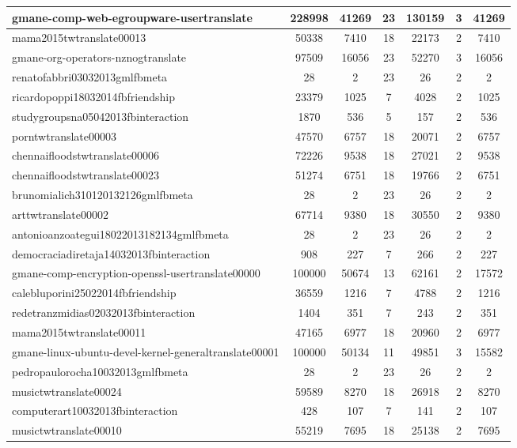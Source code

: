\begin{table*}[h!]
\begin{center}
\begin{tabular}{| l | c | c | c | c | c | c |}
gmane-comp-web-egroupware-usertranslate & 228998  & 41269  & 23  & 130159  & 3  & 41269 \\\hline
mama2015twtranslate00013 & 50338  & 7410  & 18  & 22173  & 2  & 7410 \\\hline
gmane-org-operators-nznogtranslate & 97509  & 16056  & 23  & 52270  & 3  & 16056 \\\hline
renatofabbri03032013gmlfbmeta & 28  & 2  & 23  & 26  & 2  & 2 \\\hline
ricardopoppi18032014fbfriendship & 23379  & 1025  & 7  & 4028  & 2  & 1025 \\\hline
studygroupsna05042013fbinteraction & 1870  & 536  & 5  & 157  & 2  & 536 \\\hline
porntwtranslate00003 & 47570  & 6757  & 18  & 20071  & 2  & 6757 \\\hline
chennaifloodstwtranslate00006 & 72226  & 9538  & 18  & 27021  & 2  & 9538 \\\hline
chennaifloodstwtranslate00023 & 51274  & 6751  & 18  & 19766  & 2  & 6751 \\\hline
brunomialich310120132126gmlfbmeta & 28  & 2  & 23  & 26  & 2  & 2 \\\hline
arttwtranslate00002 & 67714  & 9380  & 18  & 30550  & 2  & 9380 \\\hline
antonioanzoategui18022013182134gmlfbmeta & 28  & 2  & 23  & 26  & 2  & 2 \\\hline
democraciadiretaja14032013fbinteraction & 908  & 227  & 7  & 266  & 2  & 227 \\\hline
gmane-comp-encryption-openssl-usertranslate00000 & 100000  & 50674  & 13  & 62161  & 2  & 17572 \\\hline
calebluporini25022014fbfriendship & 36559  & 1216  & 7  & 4788  & 2  & 1216 \\\hline
redetranzmidias02032013fbinteraction & 1404  & 351  & 7  & 243  & 2  & 351 \\\hline
mama2015twtranslate00011 & 47165  & 6977  & 18  & 20960  & 2  & 6977 \\\hline
gmane-linux-ubuntu-devel-kernel-generaltranslate00001 & 100000  & 50134  & 11  & 49851  & 3  & 15582 \\\hline
pedropaulorocha10032013gmlfbmeta & 28  & 2  & 23  & 26  & 2  & 2 \\\hline
musictwtranslate00024 & 59589  & 8270  & 18  & 26918  & 2  & 8270 \\\hline
computerart10032013fbinteraction & 428  & 107  & 7  & 141  & 2  & 107 \\\hline
musictwtranslate00010 & 55219  & 7695  & 18  & 25138  & 2  & 7695 \\\hline

\end{tabular}
\end{center}
\end{table*}
